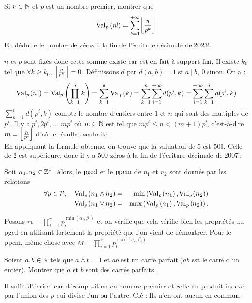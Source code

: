 \documentclass{magnolia}
\begin{document}
\begin{exoUnique}
\exo Si $n\in\mathbb{N}$ et $p$ est un nombre premier, montrer que
  \[{\rm Val}_p\p{n!}=\sum_{k=1}^{+\infty} \ent{\frac{n}{p^k}}\]
  En déduire le nombre de zéros à la fin de l'écriture décimale de $2023!$.
  \begin{sol}
  $n$ et $p$ sont fixés donc cette somme existe car est en fait à support fini. Il existe $k_0$ tel que $\forall k\geq k_0$, $\left\lfloor\frac{n}{p^k}\right\rfloor=0$.
  Définissons $d$ par $d(a,b)=1$ si $a\mid b$, $0$ sinon.
  On a :
  $${\rm Val}_p\left(n!\right)={\rm Val}_p\left(\prod_{k=1}^n k\right)=\sum_{k=1}^n{\rm Val}_p(k)=\sum_{k=1}^n\sum_{i=1}^{+\infty}d(p^i,k)=\sum_{i=1}^{+\infty}\sum_{k=1}^nd(p^i,k)$$
  $\sum_{k=1}^nd(p^i,k)$ compte le nombre d'entiers entre $1$ et $n$ qui sont des multiples de $p^i$. Il y a $p^i, 2p^i, \ldots, mp^i$ où $m\in \mathbb{N}$ est tel que $mp^i\leq n <(m+1)p^i$, c'est-à-dire $m=\left\lfloor\frac{n}{p^i}\right\rfloor$ d'où le résultat souhaité.\\
  En appliquant la formule obtenue, on trouve que la valuation de 5 est 500. Celle de 2 est supérieure, donc il y a 500 zéros à la fin de l'écriture décimale de $2007!$.
  \end{sol}  
\end{exoUnique}


\begin{proposition}
Soit $n_1,n_2\in\mathbb{Z}^*$. Alors, le $\operatorname{pgcd}$ et le $\operatorname{ppcm}$ de $n_1$ et $n_2$ sont donnés par les relations
  \begin{eqnarray*}
  \forall p\in\mathcal{P} ,\quad {\rm Val}_p \left(n_1\wedge n_2\right)&=&\min\left({\rm Val}_p\left(n_1\right),{\rm Val}_p\left(n_2\right)\right)\\
  {\rm Val}_p \left(n_1\vee n_2\right)&=&\max\left({\rm Val}_p\left(n_1\right),{\rm Val}_p\left(n_2\right)\right).
  \end{eqnarray*}
\end{proposition}

\begin{preuve}
 Posons $m=\prod_{i=1}^r p_i^{\min(\alpha_i,\beta_i)}$ et on vérifie que cela vérifie bien les propriétés du pgcd en utilisant fortement la propriété que l'on vient de démontrer.
Pour le ppcm, même chose avec $M=\prod_{i=1}^r p_i^{\max(\alpha_i,\beta_i)}$
\end{preuve}

\begin{exoUnique}
\exo Soient $a,b\in\mathbb{N}$ tels que $a\wedge b=1$ et $ab$ est un carré parfait ($ab$ est le carré
  d'un entier). Montrer que $a$ et $b$ sont des carrés parfaits.
  \begin{sol}
  Il suffit d'écrire leur décomposition en nombre premier et celle du produit indexé par l'union des $p$ qui divise l'un ou l'autre. Clé : Ils n'en ont aucun en commun.
  \end{sol}
\end{exoUnique}
\end{document}
